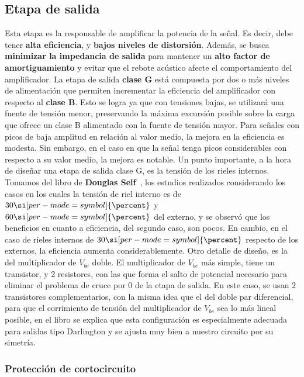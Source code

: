 \subsection{Etapa de salida}
Esta etapa es la responsable de amplificar la potencia de la señal. Es decir, debe tener \textbf{alta eficiencia}, y \textbf{bajos niveles de distorsión}. Además, se busca \textbf{minimizar la impedancia de salida} para mantener un \textbf{alto factor de amortiguamiento} y evitar que el rebote acústico afecte el comportamiento del amplificador. 
La etapa de salida \textbf{clase G} está compuesta por dos o más niveles de alimentación que permiten incrementar la eficiencia del amplificador con respecto al \textbf{clase B}. Esto se logra ya que con tensiones bajas, se utilizará una fuente de tensión menor, preservando la máxima excursión posible sobre la carga que ofrece un clase B alimentado con la fuente de tensión mayor. Para señales con picos de baja amplitud en relación al valor medio, la mejora en la eficiencia es modesta. Sin embargo, en el caso en que la señal tenga picos considerables con respecto a su valor medio, la mejora es notable. Un punto importante, a la hora de diseñar una etapa de salida clase G, es la tensión de los rieles internos. Tomamos del libro de \textbf{Douglas Self}~, los estudios realizados considerando los casos en los cuales la tensión de riel interno es de $30 \si[per-mode=symbol]{\percent}$ y $60 \si[per-mode=symbol]{\percent}$ del externo, y se observó que los beneficios en cuanto a eficiencia, del segundo caso, son pocos. En cambio, en el caso de rieles internos de $30 \si[per-mode=symbol]{\percent}$ respecto de los externos, la eficiencia aumenta considerablemente. Otro detalle de diseño, es la del multiplicador de $V_{be}$ doble. El multiplicador de $V_{be}$ más simple, tiene un transistor, y 2 resistores, con las que forma el salto de potencial necesario para eliminar el problema de cruce por $0$ de la etapa de salida. En este caso, se usan $2$ transistores complementarios, con la misma idea que el del doble par diferencial, para que el corrimiento de tensión del multiplicador de $V_{be}$ sea lo más lineal posible, en el libro se explica que esta configuración es especialmente adecuada para salidas tipo Darlington y se ajusta muy bien a nuestro circuito por su simetría.

\subsubsection{Protección de cortocircuito}

